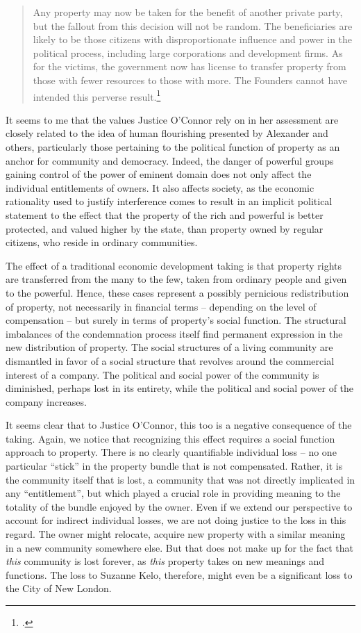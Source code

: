 \begin{quote}
Any property may now be taken for the benefit of another private party, but the fallout from this decision will not be random. The beneficiaries are likely to be those citizens with disproportionate influence and power in the political process, including large corporations and development firms. As for the victims, the government now has license to transfer property from those with fewer resources to those with more. The Founders cannot have intended this perverse result.\footcite[505]{kelo05}
\end{quote}

It seems to me that the values Justice O'Connor rely on in her assessment are closely related to the idea of human flourishing presented by Alexander and others, particularly those pertaining to the political function of property as an anchor for community and democracy. Indeed, the danger of powerful groups gaining control of the power of eminent domain does not only affect the individual entitlements of owners. It also affects society, as the economic rationality used to justify interference comes to result in an implicit political statement to the effect that the property of the rich and powerful is better protected, and valued higher by the state, than property owned by regular citizens, who reside in ordinary communities.

The effect of a traditional economic development taking is that property rights are transferred from the many to the few, taken from ordinary people and given to the powerful. Hence, these cases represent a possibly pernicious redistribution of property, not necessarily in financial terms -- depending on the level of compensation -- but surely in terms of property's social function. The structural imbalances of the condemnation process itself find permanent expression in the new distribution of property. The social structures of a living community are dismantled in favor of a social structure that revolves around the commercial interest of a company. The political and social power of the community is diminished, perhaps lost in its entirety, while the political and social power of the company increases.

It seems clear that to Justice O'Connor, this too is a negative consequence of the taking. Again, we notice that recognizing this effect requires a social function approach to property. There is no clearly quantifiable individual loss -- no one particular ``stick'' in the property bundle that is not compensated. Rather, it is the community itself that is lost, a community that was not directly implicated in any ``entitlement'', but which played a crucial role in providing meaning to the totality of the bundle enjoyed by the owner. Even if we extend our perspective to account for indirect individual losses, we are not doing justice to the loss in this regard. The owner might relocate, acquire new property with a similar meaning in a new community somewhere else. But that does not make up for the fact that {\it this} community is lost forever, as {\it this} property takes on new meanings and functions. The loss to Suzanne Kelo, therefore, might  even be a significant loss to the City of New London.


